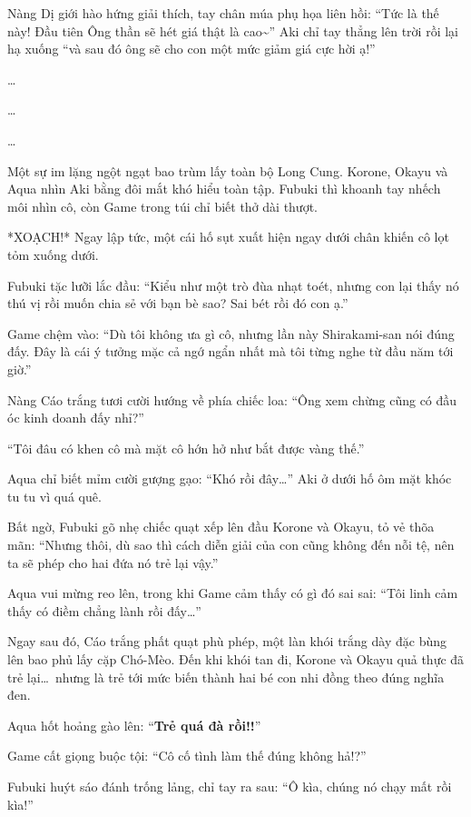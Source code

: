 \documentclass[../main.tex]{subfiles}
\begin{document}
Nàng Dị giới hào hứng giải thích, tay chân múa phụ họa liên hồi: ``Tức là thế này! Đầu tiên Ông thần sẽ hét giá thật là cao\~{}'' Aki chỉ tay thẳng lên trời rồi lại hạ xuống ``và sau đó ông sẽ cho con một mức giảm giá cực hời ạ!''

\dots

\dots

\dots

Một sự im lặng ngột ngạt bao trùm lấy toàn bộ Long Cung. Korone, Okayu và Aqua nhìn Aki bằng đôi mắt khó hiểu toàn tập. Fubuki thì khoanh tay nhếch môi nhìn cô, còn Game trong túi chỉ biết thở dài thượt.

*XOẠCH!* Ngay lập tức, một cái hố sụt xuất hiện ngay dưới chân khiến cô lọt tỏm xuống dưới.


Fubuki tặc lưỡi lắc đầu: ``Kiểu như một trò đùa nhạt toét, nhưng con lại thấy nó thú vị rồi muốn chia sẻ với bạn bè sao? Sai bét rồi đó con ạ.''

Game chệm vào: ``Dù tôi không ưa gì cô, nhưng lần này Shirakami-san nói đúng đấy. Đây là cái ý tưởng mặc cả ngớ ngẩn nhất mà tôi từng nghe từ đầu năm tới giờ.''

Nàng Cáo trắng tươi cười hướng về phía chiếc loa: ``Ông xem chừng cũng có đầu óc kinh doanh đấy nhỉ?''

``Tôi đâu có khen cô mà mặt cô hớn hở như bắt được vàng thế.''

Aqua chỉ biết mỉm cười gượng gạo: ``Khó rồi đây\dots'' Aki ở dưới hố ôm mặt khóc tu tu vì quá quê.

Bất ngờ, Fubuki gõ nhẹ chiếc quạt xếp lên đầu Korone và Okayu, tỏ vẻ thõa mãn: ``Nhưng thôi, dù sao thì cách diễn giải của con cũng không đến nỗi tệ, nên ta sẽ phép cho hai đứa nó trẻ lại vậy.''

Aqua vui mừng reo lên, trong khi Game cảm thấy có gì đó sai sai: ``Tôi linh cảm thấy có điềm chẳng lành rồi đấy\dots''

Ngay sau đó, Cáo trắng phất quạt phù phép, một làn khói trắng dày đặc bùng lên bao phủ lấy cặp Chó-Mèo. Đến khi khói tan đi, Korone và Okayu quả thực đã trẻ lại\dots\ nhưng là trẻ tới mức biến thành hai bé con nhi đồng theo đúng nghĩa đen.


Aqua hốt hoảng gào lên: ``\textbf{Trẻ quá đà rồi!!}''

Game cất giọng buộc tội: ``Cô cố tình làm thế đúng không hả!?''

Fubuki huýt sáo đánh trống lảng, chỉ tay ra sau: ``Ô kìa, chúng nó chạy mất rồi kìa!''
\end{document}
